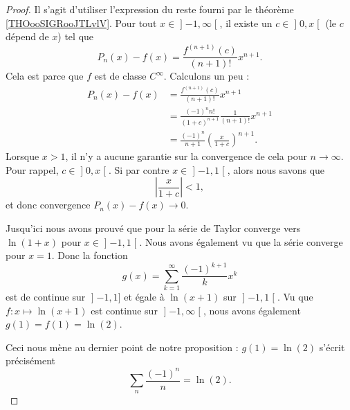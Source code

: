 \begin{proof}
Il s'agit d'utiliser l'expression du reste fourni par le théorème \ref{THOooSIGRooJTLvlV}. Pour tout \( x\in \mathopen] -1 , \infty \mathclose[\), il existe un \( c\in\mathopen] 0 , x \mathclose[\) (le \( c\) dépend de \( x\)) tel que
    \begin{equation}
        P_n(x)-f(x)=\frac{ f^{(n+1)}(c) }{ (n+1)! }x^{n+1}.
    \end{equation}
    Cela est parce que \( f\) est de classe \(  C^{\infty}\). Calculons un peu : 
    \begin{subequations}
        \begin{align}
            P_n(x)-f(x)&=\frac{ f^{(n+1)}(c) }{ (n+1)! }x^{n+1}\\
            &=\frac{ (-1)^nn! }{ (1+c)^{n+1} }\frac{1}{ (n+1)! }x^{n+1}\\
            &=\frac{ (-1)^n }{ n+1 }\left( \frac{ x }{ 1+c } \right)^{n+1}.
        \end{align}
    \end{subequations}
Lorsque \( x>1\), il n'y a aucune garantie sur la convergence de cela pour \( n\to \infty\). Pour rappel, \( c\in\mathopen] 0 , x \mathclose[\). Si par contre \( x\in\mathopen] -1 , 1 \mathclose[\), alors nous savons que
    \begin{equation}
        \left| \frac{ x }{ 1+c } \right| <1,
    \end{equation}
    et donc convergence \( P_n(x)-f(x)\to 0\).

    Jusqu'ici nous avons prouvé que pour la série de Taylor converge vers \( \ln(1+x)\) pour \( x\in \mathopen] -1 , 1 \mathclose[\). Nous avons également vu que la série converge pour \( x=1\). Donc la fonction 
        \begin{equation}
            g(x)=\sum_{k=1}^{\infty}\frac{ (-1)^{k+1} }{ k }x^k
        \end{equation}
    est de continue sur \( \mathopen] -1 , 1 \mathclose]\) et égale à \( \ln(x+1)\) sur \( \mathopen] -1 , 1 \mathclose[\). Vu que \( f\colon x\mapsto \ln(x+1)\) est continue sur \( \mathopen] -1 , \infty \mathclose[\), nous avons également \( g(1)=f(1)=\ln(2)\).

    Ceci nous mène au dernier point de notre proposition : \( g(1)=\ln(2)\) s'écrit précisément
    \begin{equation}
        \sum_n\frac{ (-1)^n }{ n }=\ln(2).
    \end{equation}
\end{proof}

